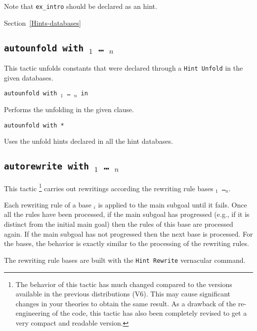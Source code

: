 \begin{coq_example*}
Note that {\tt ex\_intro} should be declared as an
hint.

\SeeAlso Section~\ref{Hints-databases}

\subsection{\tt autounfold with \ident$_1$ \mbox{\dots} \ident$_n$}
\label{autounfold}

This tactic unfolds constants that were declared through a {\tt Hint
  Unfold} in the given databases.

\begin{Variants}
\item {\tt autounfold with \ident$_1$ \dots\ \ident$_n$ in }

  Performs the unfolding in the given clause.

\item {\tt autounfold with *}

  Uses the unfold hints declared in all the hint databases.
\end{Variants}


\subsection{\tt autorewrite with \ident$_1$ \mbox{\dots} \ident$_n$}
\label{tactic:autorewrite}

This tactic \footnote{The behavior of this tactic has much changed compared to
the versions available in the previous distributions (V6). This may cause
significant changes in your theories to obtain the same result. As a drawback
of the re-engineering of the code, this tactic has also been completely revised
to get a very compact and readable version.} carries out rewritings according
the rewriting rule bases {\tt \ident$_1$ \dots \ident$_n$}.

Each rewriting rule of a base \ident$_i$ is applied to the main subgoal until
it fails. Once all the rules have been processed, if the main subgoal has
progressed (e.g., if it is distinct from the initial main goal) then the rules
of this base are processed again. If the main subgoal has not progressed then
the next base is processed. For the bases, the behavior is exactly similar to
the processing of the rewriting rules.

The rewriting rule bases are built with the {\tt Hint~Rewrite} vernacular
command.


\end{coq_example*}
